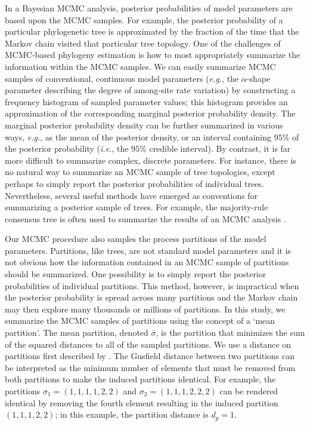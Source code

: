 \documentclass[11pt]{article}
\begin{document}
In a Bayesian MCMC analysis, posterior probabilities of model parameters are based upon the MCMC samples. 
For example, the posterior probability of a particular phylogenetic tree is approximated by the fraction of the time that the Markov chain visited that particular tree topology. 
One of the challenges of MCMC-based phylogeny estimation is how to most appropriately summarize the information within the MCMC samples.
We can easily summarize MCMC samples of conventional, continuous model parameters ({\it e.g.}, the $\alpha$-shape parameter describing the degree of among-site rate variation) by constructing a frequency histogram of sampled parameter values; this histogram provides an approximation of the corresponding marginal posterior probability density.
The marginal posterior probability density can be further summarized in various ways, {\it e.g.}, as the mean of the posterior density, or an interval containing $95\%$ of the posterior probability ({\it i.e.},  the $95\%$ credible interval).
By contrast, it is far more difficult to summarize complex, discrete parameters.
For instance, there is no natural way to summarize an MCMC sample of tree topologies, except perhaps to simply report the posterior probabilities of individual trees.
Nevertheless, several useful methods have emerged as conventions for summarizing a posterior sample of trees.
For example, the majority-rule consensus tree is often used to summarize the results of an MCMC analysis \citep[in the same way that bootstrap samples are summarized;][]{felsenstein85a}.

Our MCMC procedure also samples the process partitions of the model parameters.
Partitions, like trees, are not standard model parameters and it is not obvious how the information contained in an MCMC sample of partitions should be summarized.
One possibility is to simply report the posterior probabilities of individual partitions.
This method, however, is impractical when the posterior probability is spread across many partitions and the Markov chain may then explore many thousands or millions of partitions.
In this study, we summarize the MCMC samples of partitions using the concept of a `mean partition'. 
The mean partition, denoted $\bar{\sigma}$, is the partition that minimizes the sum of the squared distances to all of the sampled partitions.
We use a distance on partitions first described by \citet{gusfield02}.
The Gusfield distance between two partitions can be interpreted as the minimum number of elements that must be removed from both partitions to make the induced partitions identical. 
For example, the partitions $\sigma_1 = (1,1,1,1,2,2)$ and $\sigma_2 = (1,1,1,2,2,2)$ can be rendered identical by removing the fourth element resulting in the induced partition $(1,1,1,2,2)$; in this example, the partition distance is $d_p = 1$.
\end{document}
